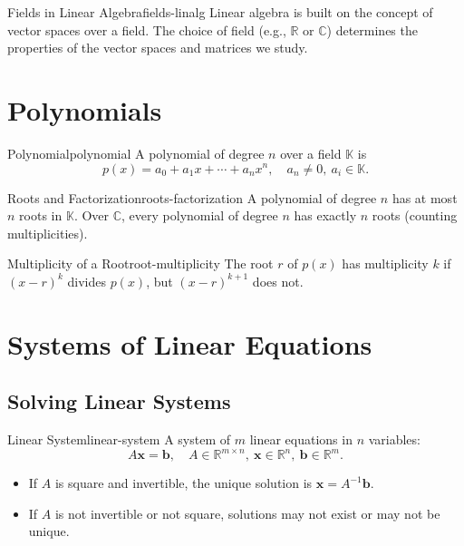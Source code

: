\begin{remark}{Fields in Linear Algebra}{fields-linalg}
    Linear algebra is built on the concept of vector spaces over a field. The choice of field (e.g., \(\mathbb{R}\) or \(\mathbb{C}\)) determines the properties of the vector spaces and matrices we study.
\end{remark}

\section{Polynomials}
\label{sec:polynomials}

\begin{definition}{Polynomial}{polynomial}
    A polynomial of degree \(n\) over a field \(\mathbb{K}\) is
    \[
        p(x) = a_0 + a_1 x + \cdots + a_n x^n, \quad a_n \neq 0,\ a_i \in \mathbb{K}.
    \]
\end{definition}

\begin{property}{Roots and Factorization}{roots-factorization}
    A polynomial of degree \(n\) has at most \(n\) roots in \(\mathbb{K}\). Over \(\mathbb{C}\), every polynomial of degree \(n\) has exactly \(n\) roots (counting multiplicities).
\end{property}

\begin{definition}{Multiplicity of a Root}{root-multiplicity}
    The root \(r\) of \(p(x)\) has multiplicity \(k\) if \((x - r)^k\) divides \(p(x)\), but \((x - r)^{k+1}\) does not.
\end{definition}

\section{Systems of Linear Equations}

\subsection{Solving Linear Systems}

\begin{definition}{Linear System}{linear-system}
    A system of \(m\) linear equations in \(n\) variables:
    \[
        A\mathbf{x} = \mathbf{b}, \quad A \in \mathbb{R}^{m \times n},\ \mathbf{x} \in \mathbb{R}^n,\ \mathbf{b} \in \mathbb{R}^m.
    \]
\end{definition}

\begin{itemize}[nosep]
    \item If \(A\) is square and invertible, the unique solution is \(\mathbf{x} = A^{-1}\mathbf{b}\).
    \item If \(A\) is not invertible or not square, solutions may not exist or may not be unique.
\end{itemize}

